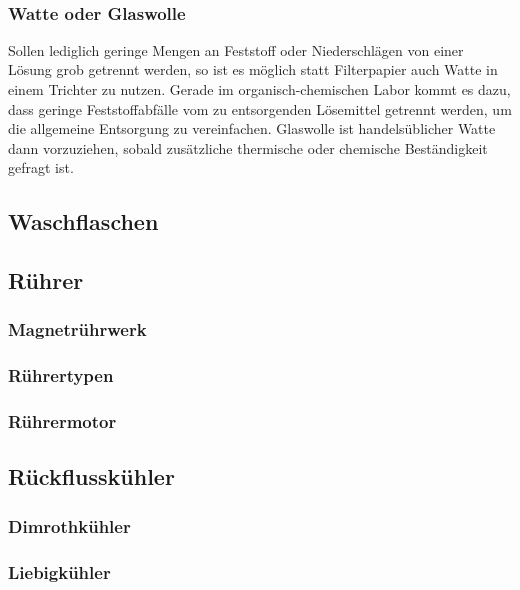
\\

\subsubsection{Watte oder Glaswolle}
Sollen lediglich geringe Mengen an Feststoff oder Niederschlägen von einer Lösung grob getrennt werden, so ist es möglich statt Filterpapier auch Watte in einem Trichter zu nutzen. Gerade im organisch-chemischen Labor kommt es dazu, dass geringe Feststoffabfälle vom zu entsorgenden Lösemittel getrennt werden, um die allgemeine Entsorgung zu vereinfachen. Glaswolle ist handelsüblicher Watte dann vorzuziehen, sobald zusätzliche thermische oder chemische Beständigkeit gefragt ist.


\subsection{Waschflaschen}

\subsection{Rührer}
\subsubsection{Magnetrührwerk}
\subsubsection{Rührertypen}
\subsubsection{Rührermotor}

\subsection{Rückflusskühler}
\subsubsection{Dimrothkühler}
\subsubsection{Liebigkühler}

